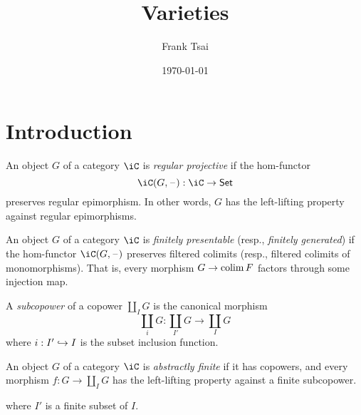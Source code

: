\documentclass{amsart}
\title{Varieties}
\author{Frank Tsai}
\date{\today}
\begin{document}
\maketitle
\tableofcontents

\section{Introduction}
\label{sec:introduction}

\begin{defn}
  An object $G$ of a category $\iC$ is \emph{regular projective} if the hom-functor
  \[
    \iC(G,\blank) : \iC \to \mathsf{Set}
  \]
  preserves regular epimorphism.
  In other words, $G$ has the left-lifting property against regular epimorphisms.
  
\end{defn}

\begin{defn}
  An object $G$ of a category $\iC$ is \emph{finitely presentable} (resp., \emph{finitely generated}) if the hom-functor $\iC(G,\blank)$ preserves filtered colimits (resp., filtered colimits of monomorphisms).
  That is, every morphism $G \to \operatorname{colim} F$ factors through some injection map.
  
\end{defn}

\begin{defn}
  A \emph{subcopower} of a copower $\coprod_{I}G$ is the canonical morphism
  \[
    \coprod_{i}G : \coprod_{I'}G \to \coprod_{I}G
  \]
  where $i : I' \hookrightarrow I$ is the subset inclusion function.
\end{defn}

\begin{defn}
  An object $G$ of a category $\iC$ is \emph{abstractly finite} if it has copowers, and every morphism $f : G \to \coprod_{I}G$ has the left-lifting property against a finite subcopower.
  
  where $I'$ is a finite subset of $I$.
\end{defn}



\end{document}
